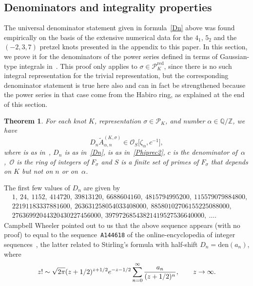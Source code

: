 \documentclass[11pt]{article}
\numberwithin{equation}{section}
\numberwithin{equation}{section}
\newtheorem{Theorem}{Theorem}[section]
\def\BZ{\mathbb Z}
\def\BQ{\mathbb Q}
\def\calP{\mathcal P}
\def\calP{\mathcal P}
\def\calO{\mathcal O}
\def\wt{\widetilde}
\def\z{\zeta}
\def\a{\alpha}
\def\a{\alpha}
\def\z{\zeta}
\def\s{\sigma}
\def\tiA{\wt A}
\def\RED{^{\text{red}}}
\begin{document}
\subsection{Denominators and integrality properties}
\label{sub.denominators}


The universal denominator statement given in formula~\eqref{Dn} above was found empirically
on the basis of the extensive numerical data for the $4_1$, $5_2$ and the $(-2,3,7)$ pretzel
knots presented in the appendix to this paper. In this section, we prove it for the denominators
of the power series defined in terms of Gaussian-type integrals in~\cite{DG2}.
This proof only applies to $\s\in\calP\RED_K$, since there is no such integral representation
for the trivial representation, but the corresponding denominator statement is true here also
and can in fact be strengthened because the power series in that case come
from the Habiro ring, as explained at the end of this section.

\begin{Theorem}
\label{thm.denom}
For each knot $K$, representation $\s\in\calP_K$, and number $\a \in \BQ/\BZ$, we have
\[%
D_n  \tiA^{(K,\s)}_{\a,n} \in \calO_S\big[\z_\a,c^{-1}\big],
\]
where \smash{$\Phi_\a^{(K,\s)}(h)$} is as in~{\rm \cite{DG2}}, $D_n$ is as in~\eqref{Dn},
\smash{$\tiA^{(K,\s)}_{\a,n}$} is as in~\eqref{Phiprec2}, $c$ is the denominator of~$\a$,~$\calO$ is the ring of integers of $F_\s$ and $S$ is a finite set of primes
of $F_\s$ that depends on $K$ but not on $n$ or on~$\a$.
\end{Theorem}

The first few values of $D_n$ are given by
\begin{align*}%
&   1, \ 24, \ 1152, \ 414720, \ 39813120,  \ 6688604160, \ 4815794995200, \  115579079884800, \\
&  22191183337881600, \ 263631258054033408000, \ 88580102706155225088000, \\
&   27636992044320430227456000, \ 39797268543821419527536640000, \ \dots.
\end{align*}
Campbell Wheeler pointed out to us that the above sequence appears (with no proof)
to equal to the sequence~\texttt{A144618} of the online-encyclopedia of integer
sequences~\cite{OEIS}, the latter related to Stirling's formula with half-shift
$D_n=\text{den}(a_n)$, where
\[%
z! \sim \sqrt{2\pi} (z+1/2)^{z+1/2} {\rm e}^{-z-1/2}
\sum_{n=0}^\infty \frac{a_n}{(z+1/2)^n},
\qquad z \to \infty .
\]
\end{document}
